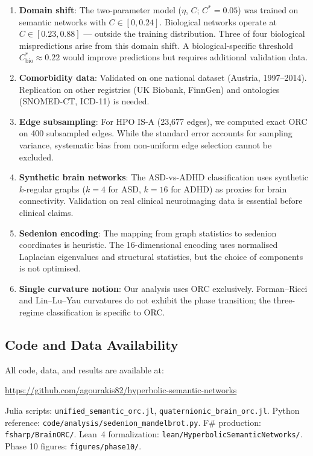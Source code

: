 \documentclass[11pt,a4paper]{article}
\newcommand{\Cstar}{C^*}
\begin{document}
\begin{enumerate}
    \item \textbf{Domain shift}: The two-parameter model ($\eta$, $C$; $\Cstar=0.05$) was trained on semantic networks with $C \in [0, 0.24]$. Biological networks operate at $C \in [0.23, 0.88]$ --- outside the training distribution. Three of four biological mispredictions arise from this domain shift. A biological-specific threshold $\Cstar_{\mathrm{bio}} \approx 0.22$ would improve predictions but requires additional validation data.
    \item \textbf{Comorbidity data}: Validated on one national dataset (Austria, 1997--2014). Replication on other registries (UK Biobank, FinnGen) and ontologies (SNOMED-CT, ICD-11) is needed.
    \item \textbf{Edge subsampling}: For HPO IS-A (23,677 edges), we computed exact ORC on 400 subsampled edges. While the standard error accounts for sampling variance, systematic bias from non-uniform edge selection cannot be excluded.
    \item \textbf{Synthetic brain networks}: The ASD-vs-ADHD classification uses synthetic $k$-regular graphs ($k=4$ for ASD, $k=16$ for ADHD) as proxies for brain connectivity. Validation on real clinical neuroimaging data is essential before clinical claims.
    \item \textbf{Sedenion encoding}: The mapping from graph statistics to sedenion coordinates is heuristic. The 16-dimensional encoding uses normalised Laplacian eigenvalues and structural statistics, but the choice of components is not optimised.
    \item \textbf{Single curvature notion}: Our analysis uses ORC exclusively. Forman--Ricci and Lin--Lu--Yau curvatures do not exhibit the phase transition; the three-regime classification is specific to ORC.
\end{enumerate}

\subsection{Code and Data Availability}

All code, data, and results are available at:

\smallskip
\noindent\url{https://github.com/agourakis82/hyperbolic-semantic-networks}
\smallskip

\noindent Julia scripts: \texttt{unified\_semantic\_orc.jl}, \texttt{quaternionic\_brain\_orc.jl}. Python reference: \texttt{code/analysis/sedenion\_mandelbrot.py}. F\# production: \texttt{fsharp/BrainORC/}. Lean~4 formalization: \texttt{lean/HyperbolicSemanticNetworks/}. Phase 10 figures: \texttt{figures/phase10/}.
\end{document}
